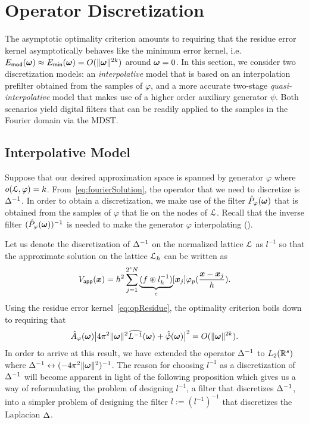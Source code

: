 \section{Operator Discretization}
\label{sec:opDisc}

The asymptotic optimality criterion amounts to requiring that the
residue error kernel asymptotically behaves like the minimum error
kernel, i.e. $E_{\mathsf{mod}}(\boldsymbol{\omega}) \approx
E_{\mathsf{min}}(\boldsymbol{\omega}) = O(\lVert\boldsymbol{\omega}\rVert^{2k})$ around
$\boldsymbol{\omega} = 0$. In this section, we consider two discretization
models: an \emph{interpolative} model that is based on an
interpolation prefilter obtained from the samples of $\varphi$, and a
more accurate two-stage \emph{quasi-interpolative} model that makes
use of a higher order auxiliary generator $\psi$. Both scenarios yield
digital filters that can be readily applied to the samples in the
Fourier domain via the MDST.

\subsection{Interpolative Model}
\label{sec:interpModel}
Suppose that our desired approximation space is spanned by generator
$\varphi$ where $o(\mathcal{L},\varphi) =
k$. From~\eqref{eq:fourierSolution}, the operator that we need to
discretize is $\mathop{\Delta^{-1}}$. In order to obtain a discretization, we
make use of the filter $\hat{P}_{\varphi}(\boldsymbol{\omega})$ that is
obtained from the samples of $\varphi$ that lie on the nodes of
$\mathcal{L}$. Recall that the inverse filter
$(\hat{P}_{\varphi}(\boldsymbol{\omega}))^{-1}$ is needed to make the generator $\varphi$
interpolating ().

Let us denote the discretization of $\mathop{\Delta^{-1}}$ on the normalized lattice
$\mathcal{L}$ as $l^{-1}$ so that the approximate solution on the lattice
$\mathcal{L}_h$ can be written as
\begin{equation}
\appf{V}(\vect{x}) = h^2 \sum_{j=1}^{2^s N}
\underbrace{(f \pconv l^{-1}_h)}_{c}[\vect{x}_j]
\varphi_p(\frac{\vect{x}-\vect{x}_j}{h}).
\label{eq:approxHomogeneous}
\end{equation}
Using the
residue error kernel~\eqref{eq:opResidue}, the optimality criterion
boils down to requiring that
\begin{equation}
  \ft{A}_{\varphi}(\vect{\omega})
  \bigl|
  4 \pi^2 \norm{\vect{\omega}}^2 \wft{L^{-1}}(\vect{\omega})
  + 
  \ft{\dual{\varphi}}(\vect{\omega}) 
  \bigr|^2
  = 
  O(\norm{\vect{\omega}}^{2k}).
  \label{eq:opCriterionHomo}
  \end{equation}
  In order to arrive at this result, we have extended the operator
  $\mathop{\Delta^{-1}}$ to $L_2(\mathbb{R}^s)$ where $\mathop{\Delta^{-1}} \leftrightarrow (-4
    \pi^2 \lVert\boldsymbol{\omega}\rVert^2)^{-1}$. The reason for choosing
  $l^{-1}$ as a discretization of $\mathop{\Delta^{-1}}$ will become apparent
  in light of the following proposition which gives us a way of
  reformulating the problem of designing $l^{-1}$, a filter that
  discretizes $\mathop{\Delta^{-1}}$, into a simpler problem of designing the
  filter $l := (l^{-1})^{-1}$ that discretizes the Laplacian
  $\mathop{\Delta}$.

